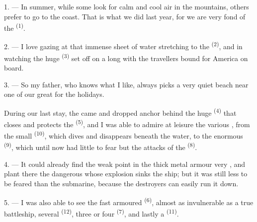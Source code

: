 %

\VUsaut{4.0mm}
\VUsaut{3.0mm}
\VUsaut{3.0mm}

1. --- In summer, while some look for calm and cool air in the mountains, others prefer to go
to the coast. That is what we did last year, for we are very fond of the 
\textsuperscript{(1)}.

2. --- I love gazing at that immense sheet of water stretching to the 
\textsuperscript{(2)}, and in watching the huge  \textsuperscript{(3)} set
off on a long
 with the travellers bound for America on board.

3. --- So my father, who knows what I like, always picks a very quiet beach near one of our
great  for the holidays.

During our last stay, the  came and dropped anchor behind the huge
 \textsuperscript{(4)} that closes and protects the
 \textsuperscript{(5)}, and I was able to admire at leisure the
various , from the small  \textsuperscript{(10)}, which
dives and disappears beneath the water, to the enormous
 \textsuperscript{(9)}, which until now had little to fear but the
attacks of the  \textsuperscript{(8)}.

\VUsaut{3.0mm}
\VUsaut{3.0mm}

4. --- It could already find the weak point in the thick metal armour very ,
and plant there the dangerous
 whose explosion sinks the ship; but it was still less to be
feared than the submarine, because the destroyers can easily run it down.

5. --- I was also able to see the fast armoured  \textsuperscript{(6)},
almost as invulnerable as a true battleship, several
 \textsuperscript{(12)}, three or four 
\textsuperscript{(7)}, and lastly a  \textsuperscript{(11)}.

